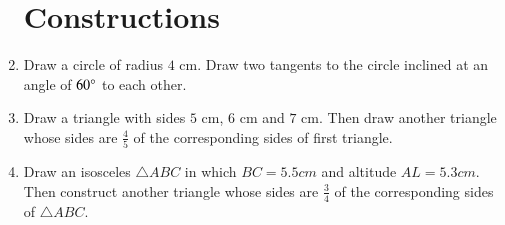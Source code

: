 \documentclass[12pt,-letter paper]{article}
\theoremstyle{remark}
\begin{document}
\begin{enumerate}
\section{Constructions}    
\item Draw a circle of radius $4$ cm. Draw two tangents to the circle inclined at an angle of $ 60 \degree $ to each other.\\
\item Draw a triangle with sides $5$ cm, $6$ cm and $7$ cm. Then draw another triangle whose sides are $\frac{4}{5}$ of the corresponding sides of first triangle.\\
\item Draw an isosceles $\triangle ABC$ in which $BC=5.5 cm$ and altitude $AL=5.3 cm$. Then construct another triangle whose sides are $\frac{3}{4}$ of the corresponding sides of $\triangle ABC$.\\
\end{enumerate}
\end{document}

